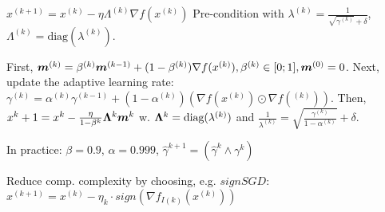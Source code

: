  $x^{(k+1)} = x^{(k)} - \eta \Lambda^{(k)} \nabla f(x^{(k)})$ Pre-condition with $\lambda^{(k)} = \frac{1}{\sqrt{\gamma^{(k)}} + \delta}$, $\Lambda^{(k)} = \text{diag}(\lambda^{(k)})$.
 
 First,
 $\boldsymbol{m}^{(k)} = \beta^{(k)} \boldsymbol{m}^{(k-1)} + (1 - \beta^{(k)}) \nabla f(x^{(k)}), \beta^{(k)} \in [0;1], \boldsymbol{m}^{(0)} = 0$. Next, update the adaptive learning rate: $\gamma^{(k)} = \alpha^{(k)}\gamma^{(k-1)} + (1 - \alpha^{(k)})(\nabla f(x^{(k)}) \odot \nabla f(^{(k)}))$. Then,
 $x^k+1=x^k-\frac{\eta}{1-\beta^k}\boldsymbol{\Lambda}^k\boldsymbol{m}^k$ w.
 $\boldsymbol{\Lambda}^{k} = \text{diag}(\lambda^{(k)})$ and $\frac{1}{\lambda^{(k)}} = \sqrt{\frac{\gamma^{(k)}}{1 - \alpha^{(k)}}} + \delta$.
 
 In practice: $\beta=0.9$, $\alpha=0.999$, $\hat{\gamma}^{k+1}= (\hat{\gamma}^k\wedge \gamma^k)$
 
  Reduce comp. complexity by choosing, e.g. $signSGD$:
 $x^{(k+1)} = x^{(k)} - \eta_k \cdot sign(\nabla f_{I(k)}(x^{(k)}))$